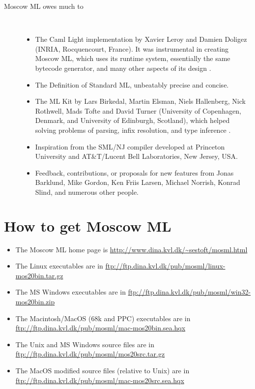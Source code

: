 \documentclass[fleqn,a4paper]{article}
\begin{document}
\begin{description}
\item[Moscow ML owes much to]\mbox{ }
\begin{itemize}
\item The Caml Light implementation by Xavier Leroy and Damien Doligez
  (INRIA, Rocquencourt, France).  It was instrumental in creating
  Moscow ML, which uses its runtime system, essentially the same
  bytecode generator, and many other aspects of its design
  \cite{Leroy:1990:TheZinc,Leroy:1993:TheCaml}.
\item The Definition of Standard ML, unbeatably precise and concise.
\item The ML Kit by Lars Birkedal, Martin Elsman, Niels Hallenberg,
  Nick Rothwell, Mads Tofte and David Turner (University of
  Copenhagen, Denmark, and University of Edinburgh, Scotland), which
  helped solving problems of parsing, infix resolution, and type
  inference \cite{Birkedal:1993:TheML}.
\item Inspiration from the SML/NJ compiler developed at Princeton
  University and AT\&T/Lucent Bell Laboratories, New Jersey,
  USA.
\item Feedback, contributions, or proposals for new features from
  Jonas Barklund, Mike Gordon, Ken Friis Larsen, Michael Norrish,
  Konrad Slind, and numerous other people.
\end{itemize}
\end{description}


\section{How to get Moscow ML}
\label{sec-how-to-get}

\begin{itemize}
\item The Moscow ML home page is
        \url{http://www.dina.kvl.dk/~sestoft/mosml.html}
\item The Linux executables are in
        \url{ftp://ftp.dina.kvl.dk/pub/mosml/linux-mos20bin.tar.gz}
\item The MS Windows executables are in 
        \url{ftp://ftp.dina.kvl.dk/pub/mosml/win32-mos20bin.zip}
\item The Macintosh/MacOS (68k and PPC) executables are in\\
        \url{ftp://ftp.dina.kvl.dk/pub/mosml/mac-mos20bin.sea.hqx}
\item The Unix and MS Windows source files are in 
        \url{ftp://ftp.dina.kvl.dk/pub/mosml/mos20src.tar.gz}
\item The MacOS modified source files (relative to Unix) are in\\
        \url{ftp://ftp.dina.kvl.dk/pub/mosml/mac-mos20src.sea.hqx}
\end{itemize}
\end{document}
